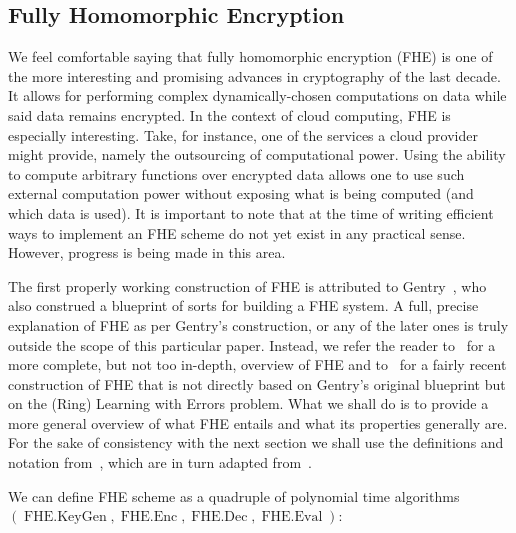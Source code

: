 \documentclass[11pt, a4paper]{article}
\newcommand{\op}[1]{\operatorname{#1}}
\begin{document}


\subsection{Fully Homomorphic Encryption}

We feel comfortable saying that fully homomorphic encryption (FHE) is one of the more interesting and promising advances in cryptography of the last decade.
It allows for performing complex dynamically-chosen computations on data while said data remains encrypted.
In the context of cloud computing, FHE is especially interesting.
Take, for instance, one of the services a cloud provider might provide, namely the outsourcing of computational power.
Using the ability to compute arbitrary functions over encrypted data allows one to use such external computation power without exposing what is being computed (and which data is used).
It is important to note that at the time of writing efficient ways to implement an FHE scheme do not yet exist in any practical sense.
However, progress is being made in this area.

The first properly working construction of FHE is attributed to Gentry~\cite{gentry2009fully}, who also construed a blueprint of sorts for building a FHE system.
A full, precise explanation of FHE as per Gentry's construction, or any of the later ones is truly outside the scope of this particular paper.
Instead, we refer the reader to~\cite{vaikuntanathan2011computing} for a more complete, but not too in-depth, overview of FHE and to~\cite{brakerski2012leveled} for a fairly recent construction of FHE that is not directly based on Gentry's original blueprint but on the (Ring) Learning with Errors problem.
What we shall do is to provide a more general overview of what FHE entails and what its properties generally are.
For the sake of consistency with the next section we shall use the definitions and notation from~\cite{goldwasser2013reusable}, which are in turn adapted from~\cite{vaikuntanathan2011computing}.

We can define FHE scheme as a quadruple of polynomial time algorithms $(\op{FHE.KeyGen}, \op{FHE.Enc}, \op{FHE.Dec}, \op{FHE.Eval})$:
\end{document}
